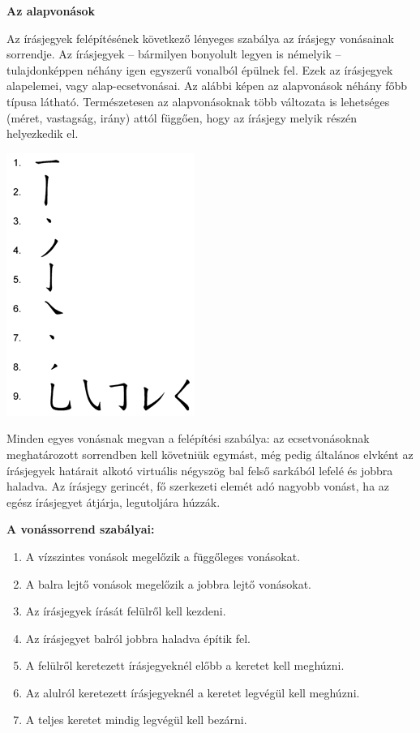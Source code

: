 
{\large \textbf{Az alapvonások}}

Az írásjegyek felépítésének következő lényeges szabálya az írásjegy vonásainak sorrendje. Az írásjegyek – bármilyen bonyolult legyen is némelyik – tulajdonképpen néhány igen egyszerű vonalból épülnek fel. Ezek az írásjegyek alapelemei, vagy alap-ecsetvonásai. Az alábbi képen az alapvonások néhány főbb típusa látható. Természetesen az alapvonásoknak több változata is lehetséges (méret, vastagság, irány) attól függően, hogy az írásjegy melyik részén helyezkedik el.

\begin{center}
	\includegraphics[width=0.4\linewidth]{images/chinese_strokes.png}
\end{center}

Minden egyes vonásnak megvan a felépítési szabálya: az ecsetvonásoknak meghatározott sorrendben kell követniük egymást, még pedig általános elvként az írásjegyek határait alkotó virtuális négyszög bal felső sarkából lefelé és jobbra haladva. Az írásjegy gerincét, fő szerkezeti elemét adó nagyobb vonást, ha az egész írásjegyet átjárja, legutoljára húzzák.

\newpage
{\large \textbf{A vonássorrend szabályai: }}
\begin{enumerate}
	\item A vízszintes vonások megelőzik a függőleges vonásokat.
	\item A balra lejtő vonások megelőzik a jobbra lejtő vonásokat. 
	\item Az írásjegyek írását felülről kell kezdeni. 
	\item Az írásjegyet balról jobbra haladva építik fel. 
	\item A felülről keretezett írásjegyeknél előbb a keretet kell meghúzni. 
	\item Az alulról keretezett írásjegyeknél a keretet legvégül kell meghúzni. 
	\item A teljes keretet mindig legvégül kell bezárni.
\end{enumerate}

